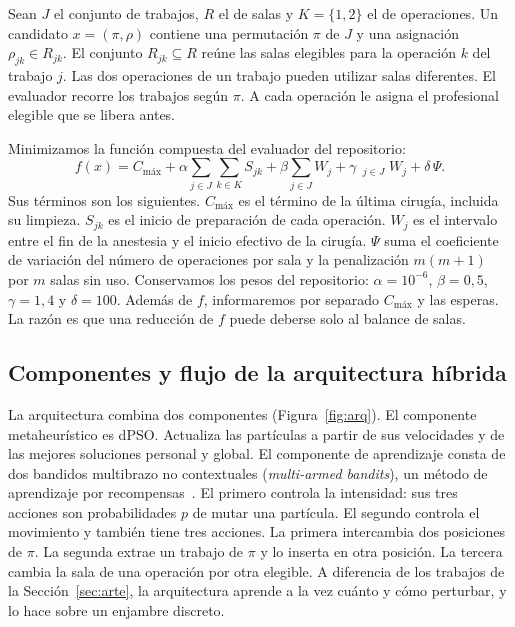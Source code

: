 \documentclass[10pt,a4paper]{article}
\DeclareMathOperator*{\maxop}{m\acute{a}x}
\newcommand{\Cmax}{C_{\text{máx}}}
\newcommand{\dc}{{,}}%
\begin{document}
Sean $J$ el conjunto de trabajos, $R$ el de salas y $K=\{1,2\}$ el de operaciones. Un candidato
$x=(\pi,\rho)$ contiene una permutación $\pi$ de $J$ y una asignación $\rho_{jk}\in R_{jk}$. El
conjunto $R_{jk}\subseteq R$ reúne las salas elegibles para la operación $k$ del trabajo $j$.
Las dos operaciones de un trabajo pueden utilizar salas diferentes. El evaluador recorre los
trabajos según $\pi$. A cada operación le asigna el profesional elegible que se libera antes.

Minimizamos la función compuesta del evaluador del repositorio:
\begin{equation}
f(x)=\Cmax+\alpha\sum_{j\in J}\sum_{k\in K}S_{jk}+\beta\sum_{j\in J}W_j
+\gamma\,\maxop_{j\in J}W_j+\delta\,\Psi .
\label{eq:f}
\end{equation}
Sus términos son los siguientes. $\Cmax$ es el término de la última cirugía, incluida su
limpieza. $S_{jk}$ es el inicio de preparación de cada operación. $W_j$ es el intervalo entre
el fin de la anestesia y el inicio efectivo de la cirugía. $\Psi$ suma el coeficiente de
variación del número de operaciones por sala y la penalización $m(m+1)$ por $m$ salas sin uso.
Conservamos los pesos del repositorio: $\alpha=10^{-6}$, $\beta=0\dc5$, $\gamma=1\dc4$ y
$\delta=100$. Además de $f$, informaremos por separado $\Cmax$ y las esperas. La razón es que
una reducción de $f$ puede deberse solo al balance de salas.

\subsection{Componentes y flujo de la arquitectura híbrida}

La arquitectura combina dos componentes (Figura~\ref{fig:arq}). El componente metaheurístico
es dPSO. Actualiza las partículas a partir de sus velocidades y de las mejores soluciones
personal y global. El componente de aprendizaje consta de dos bandidos multibrazo no
contextuales (\emph{multi-armed bandits}), un método de aprendizaje por
recompensas~\cite{sutton2018}. El primero controla la intensidad: sus tres acciones son
probabilidades $p$ de mutar una partícula. El segundo controla el movimiento y también tiene
tres acciones. La primera intercambia dos posiciones de $\pi$. La segunda extrae un trabajo de
$\pi$ y lo inserta en otra posición. La tercera cambia la sala de una operación por otra
elegible. A diferencia de los trabajos de la Sección~\ref{sec:arte}, la arquitectura aprende a
la vez cuánto y cómo perturbar, y lo hace sobre un enjambre discreto.
\end{document}
